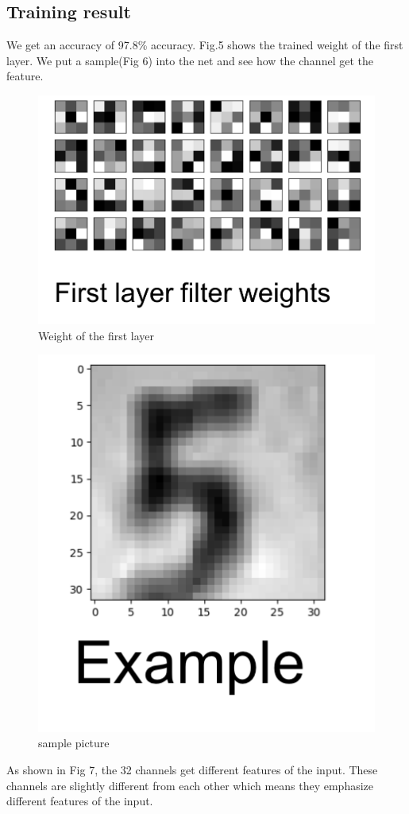 \documentclass[twocolumn]{webofc}
\begin{document}
\subsection{Training result}
We get an accuracy of 97.8\% accuracy. 
Fig.5 shows the trained weight of the first layer. We put a sample(Fig 6) into the net and see how the channel get the feature. 

\begin{figure}[H]
  \centering
  \includegraphics[width=\columnwidth]{weitpng.png}
  \caption{Weight of the first layer}
\end{figure}
\begin{figure}[H]
  \centering
  \includegraphics[width=0.6\columnwidth]{sample.png}
  \caption{sample picture}
\end{figure}
As shown in Fig 7, the 32 channels get different features of the input. These channels are slightly different from each other which means they emphasize different features of the input. 
\end{document}
